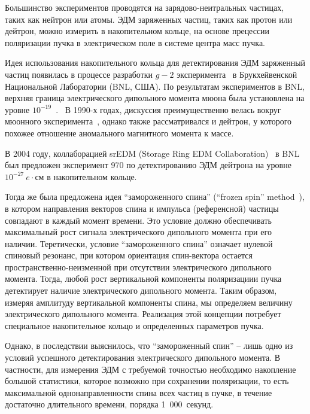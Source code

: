 Большинство экспериментов проводятся на зарядово-неитральных частицах, таких как нейтрон или атомы. ЭДМ заряженных частиц, таких как протон или дейтрон, можно измерить в накопительном кольце, на основе прецессии поляризации пучка в электрическом поле в системе центра масс пучка.

Идея использования накопительного кольца для детектирования ЭДМ заряженный частиц появилась в процессе разработки $g-2$ эксперимента~\cite{BNL:g-2:2001} в Брукхейвенской Национальной Лаборатории (BNL, США). По результатам экспериментов в BNL, верхняя граница электрического дипольного момента мюона была установлена на уровне $10^{-19}$~\ecm.~\cite{BNL:muon_ANA:2009} В 1990-х годах, дискуссия преимущественно велась вокруг мюонного эксперимента~\cite{Farley:SREDM:Muon}, однако также рассматривался и дейтрон, у которого похожее отношение аномального магнитного момента к массе.

В 2004 году, коллаборацией srEDM (Storage Ring EDM Collaboration)~\cite{BNL:SREDM} в BNL был предложен эксперимент 970 по детектированию ЭДМ дейтрона на уровне $10^{-27}~e\cdot$см в накопительном кольце. 

Тогда же была предложена идея ``замороженного спина'' (``frozen spin'' method~\cite{Farley:SREDM:Muon}), в котором направления векторов спина и импульса (референсной) частицы совпадают в каждый момент времени. Это условие должно обеспечивать максимальный рост сигнала электрического дипольного момента при его наличии. Теретически, условие ``замороженного спина'' означает нулевой спиновый резонанс, при котором ориентация спин-вектора остается  пространственно-неизменной при отсутствии электрического дипольного момента. Тогда, любой рост вертикальной компоненты поляризациии пучка детектирует наличие электрического дипольного момента. Таким образом, измеряя  амплитуду вертикальной компоненты спина, мы определяем величину электрического дипольного момента. Реализация этой концепции потребует специальное накопительное кольцо и определенных параметров пучка.

Однако, в последствии выяснилось, что ``замороженный спин'' -- лишь одно из условий успешного детектирования электрического дипольного момента. В частности, для измерения ЭДМ с требуемой точностью необходимо накопление большой статистики, которое возможно при сохранении поляризации, то есть максимальной однонаправленности спина всех частиц в пучке, в течение достаточно длительного времени, порядка 1~000~секунд. 

